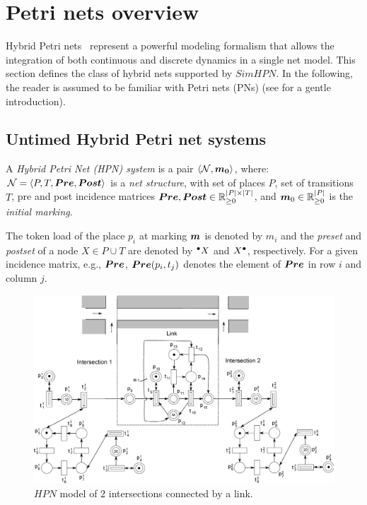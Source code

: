 

\chapter{Petri nets overview}

Hybrid Petri nets~\cite{BODavid10,ARBaMeGi00} represent a powerful modeling formalism
that allows the integration of both continuous and discrete dynamics in a single net model. This
section defines the class of hybrid nets supported by $SimHPN$. In the following, the reader
is assumed to be familiar with Petri nets (PNs) (see \cite{ARMura89,BODHPSV93}
for a gentle introduction).

\section{Untimed Hybrid Petri net  systems}
\label{s:untimedHPN}

\begin{defn}
\label{d:uhpn}
A \emph{Hybrid Petri Net (HPN) system} is a pair $\sys$, where: $\N = \langle
P,T,\Pre,\Post\rangle$ is a \emph{net structure}, with set of places
$P$, set of transitions $T$, pre and post incidence matrices
$\Pre, \Post \in \rea^{|P|\times |T|}_{\geq 0}$, and $\b{m}_0\in \rea^{|P|}_{\geq 0}$ is the
\emph{initial marking}.
\end{defn}

The token load of the place $p_i$ at marking $\b{m}$ is denoted by
$m_i$ and the \emph{preset} and \emph{postset} of a node $X \in P \cup
T$ are denoted by $\,\!^\bullet{X}$ and ${X}^\bullet$, respectively. For
a given incidence matrix, e.g., $\Pre$, $\Pre(p_i,t_j)$ denotes the element of
$\Pre$ in row $i$ and column $j$.

\begin{figure}
\centering
\includegraphics[width=.81\textwidth]{figs/modelo2}
\caption{$HPN$ model of $2$ intersections connected by a link.}
\label{f-traffic}
\end{figure}


